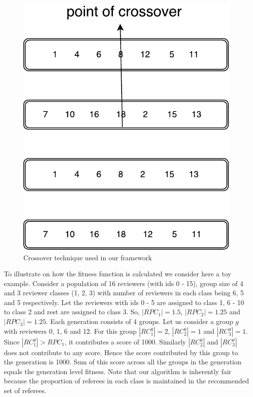 \begin{figure}
\centering
\includegraphics[scale=0.32]{./texfiles/Chapter_4/cikm_17/figures/cross_over.pdf}
\caption{\label{c_o} Crossover technique used in our framework}
\vspace{4mm}
\end{figure}

To illustrate on how the fitness function is calculated we consider here a toy example. Consider a population of 16 reviewers (with ids 0 - 15), group size of 4 and 3 reviewer classes (1, 2, 3) with number of reviewers in each class being 6, 5 and 5 respectively. Let the reviewers with ids 0 - 5 are assigned to class 1, 6 - 10 to class 2 and rest are assigned to class 3. 
So, $|RPC_1| = 1.5$, $|RPC_2| = 1.25$ and $|RPC_3| = 1.25$.
Each generation consists of 4 groups. Let us consider a group $g$ with reviewers 0, 1, 6 and 12. For this group  $|RC_1^{g}| = 2$, $|RC_2^{g}| = 1$ and $|RC_3^{g}| = 1$. Since $|RC_1^{g}| > RPC_1$, it contributes a score of 1000. Similarly $|RC_2^{g}|$ and $|RC_3^{g}|$ does not contribute to any score. 
Hence the score contributed by this group to the generation is 1000. Sum of this score across all the groups in the generation equals the generation level fitness. 
Note that our algorithm is inherently fair because the proportion of referees in each class is maintained in the recommended set of referees.

